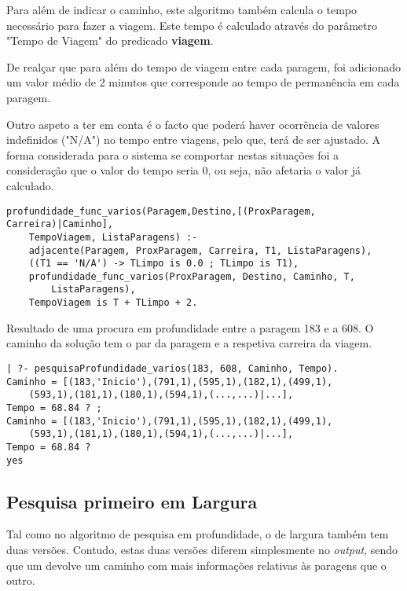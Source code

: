 \documentclass[a4paper,12pt]{report}
\begin{document}
Para além de indicar o caminho, este algoritmo também calcula o tempo necessário para fazer a viagem. Este tempo é calculado através do parâmetro "Tempo de Viagem"\hspace{0.001cm} do predicado \textbf{viagem}. 
\par De realçar que para além do tempo de viagem entre cada paragem, foi adicionado um valor médio de 2 minutos que corresponde ao tempo de permanência em cada paragem. 
\vspace{0.3cm}
\par Outro aspeto a ter em conta é o facto que poderá haver ocorrência de valores indefinidos ("N/A") no tempo entre viagens, pelo que, terá de ser ajustado. A forma considerada para o sistema se comportar nestas situações foi a consideração que o valor do tempo seria 0, ou seja, não afetaria o valor já calculado.

\begin{verbatim}
profundidade_func_varios(Paragem,Destino,[(ProxParagem, Carreira)|Caminho], 
    TempoViagem, ListaParagens) :- 
    adjacente(Paragem, ProxParagem, Carreira, T1, ListaParagens),
    ((T1 == 'N/A') -> TLimpo is 0.0 ; TLimpo is T1),
    profundidade_func_varios(ProxParagem, Destino, Caminho, T, 
        ListaParagens),
    TempoViagem is T + TLimpo + 2.                          
\end{verbatim}

\vspace{1cm}

Resultado de uma procura em profundidade entre a paragem 183 e a 608. O caminho da solução tem o par da paragem e a respetiva carreira da viagem.

\begin{verbatim}
| ?- pesquisaProfundidade_varios(183, 608, Caminho, Tempo).
Caminho = [(183,'Inicio'),(791,1),(595,1),(182,1),(499,1),
    (593,1),(181,1),(180,1),(594,1),(...,...)|...],
Tempo = 68.84 ? ;
Caminho = [(183,'Inicio'),(791,1),(595,1),(182,1),(499,1),
    (593,1),(181,1),(180,1),(594,1),(...,...)|...],
Tempo = 68.84 ? 
yes
\end{verbatim}

\vspace{10cm}

\subsection{Pesquisa primeiro em Largura}

Tal como no algoritmo de pesquisa em profundidade, o de largura também tem duas versões. Contudo, estas duas versões diferem simplesmente no \textit{output}, sendo que um devolve um caminho com mais informações relativas às paragens que o outro.
\end{document}
